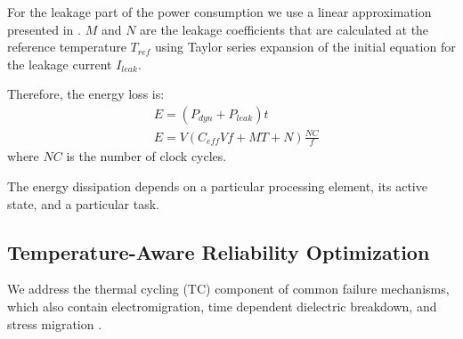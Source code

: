 For the leakage part of the power consumption we use a linear approximation presented in \cite{liu2007}. $M$ and $N$ are the leakage coefficients that are calculated at the reference temperature $T_{ref}$ using Taylor series expansion of the initial equation for the leakage current $I_{leak}$.

Therefore, the energy loss is:
\begin{align*}
  & E = (P_{dyn} + P_{leak}) t \\
  & E = V (C_{eff} V f + MT + N) \frac{NC}{f}
\end{align*}
where $NC$ is the number of clock cycles.

The energy dissipation depends on a particular processing element, its active state, and a particular task.

\subsection{Temperature-Aware Reliability Optimization}
We address the thermal cycling (TC) component of common failure mechanisms, which also contain electromigration, time dependent dielectric breakdown, and stress migration \cite{xiang2010}.
